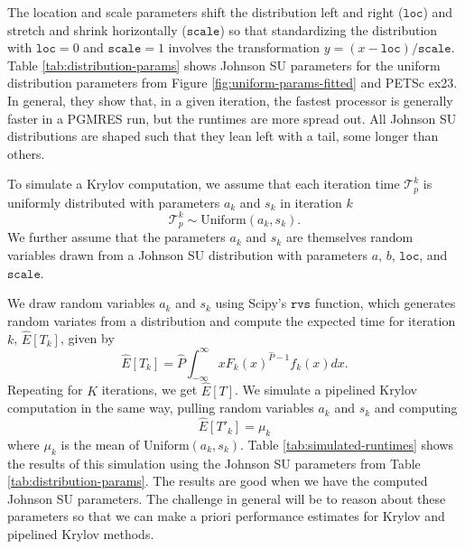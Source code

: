 \documentclass[sigconf, anonymous]{acmart}
\begin{document}
The location and scale parameters shift the distribution left and right (${\texttt{loc}}$) and stretch and shrink horizontally (${\texttt{scale}}$) so that standardizing the distribution with ${\texttt{loc}} = 0$ and ${\texttt{scale}} = 1$ involves the transformation $y = (x - {\texttt{loc}})/{\texttt{scale}}$.
Table \ref{tab:distribution-params} shows Johnson SU parameters for the  uniform distribution parameters from Figure \ref{fig:uniform-params-fitted} and PETSc ex23. In general, they show that, in a given iteration, the fastest processor is generally faster in a PGMRES run, but the runtimes are more spread out. All Johnson SU distributions are shaped such that they lean left with a tail, some longer than others.

To simulate a Krylov computation, we assume that each iteration time $\mathcal{T}_p^k$ is uniformly distributed with parameters $a_k$ and $s_k$ in iteration $k$
$$\mathcal{T}_p^k \sim \text{Uniform}(a_k, s_k).$$ 
We further assume that the parameters $a_k$ and $s_k$ are themselves random variables drawn from a Johnson SU distribution with parameters $a$, $b$, $\texttt{loc}$, and $\texttt{scale}$.

We draw random variables $a_k$ and $s_k$  using Scipy's $\texttt{rvs}$ function, which generates random variates from a distribution and compute the expected time for iteration $k$, $\widehat{E}[T_k]$, given by 
\begin{equation}
\widehat{E}[T_k] =  \widehat{P} \int ^{\infty}_{-\infty} x F_k(x)^{\widehat{P}-1} f_k(x) dx.
\end{equation}
Repeating for $K$ iterations, we get $\widehat{E}[T]$. 
We simulate a pipelined Krylov computation in the same way, pulling random variables $a_k$ and $s_k$ and computing 
\begin{equation}
\widehat{E}[T'_k] =  \mu_k
\end{equation}
where $\mu_k$ is the mean of $\text{Uniform}(a_k, s_k)$. 
Table \ref{tab:simulated-runtimes} shows the results of this simulation using the Johnson SU parameters from Table \ref{tab:distribution-params}. The results are good when we have the computed Johnson SU parameters. The challenge in general will be to reason about these parameters so that we can make a priori performance estimates for Krylov and pipelined Krylov methods.
\end{document}
